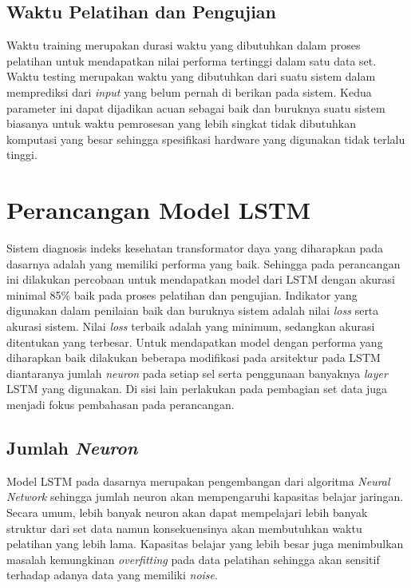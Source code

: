 \subsection{Waktu Pelatihan dan Pengujian}
Waktu training merupakan durasi waktu yang dibutuhkan dalam proses pelatihan untuk mendapatkan nilai performa tertinggi dalam satu data set. Waktu testing merupakan waktu yang dibutuhkan dari suatu sistem dalam memprediksi dari \textit{input} yang belum pernah di berikan pada sistem. Kedua parameter ini dapat dijadikan acuan sebagai baik dan buruknya suatu sistem biasanya untuk waktu pemrosesan  yang lebih singkat tidak dibutuhkan komputasi yang besar sehingga spesifikasi hardware yang digunakan tidak terlalu tinggi.

\section{Perancangan Model LSTM}

Sistem diagnosis indeks kesehatan transformator daya yang diharapkan pada dasarnya adalah yang memiliki performa yang baik. Sehingga pada perancangan ini dilakukan percobaan untuk mendapatkan model dari LSTM dengan akurasi minimal 85\% baik pada proses pelatihan dan pengujian. Indikator yang digunakan dalam penilaian baik dan buruknya sistem adalah nilai \textit{loss} serta akurasi sistem. Nilai \textit{loss} terbaik adalah yang minimum, sedangkan akurasi ditentukan yang terbesar. Untuk mendapatkan model dengan performa yang diharapkan baik dilakukan beberapa modifikasi pada arsitektur pada LSTM diantaranya jumlah \textit{neuron} pada setiap sel serta penggunaan banyaknya \textit{layer} LSTM yang digunakan. Di sisi lain perlakukan pada pembagian set data juga menjadi fokus pembahasan pada perancangan.

\subsection{Jumlah \textit{Neuron}}
Model LSTM pada dasarnya merupakan pengembangan dari algoritma \textit{Neural Network} sehingga jumlah neuron akan mempengaruhi kapasitas belajar jaringan. Secara umum, lebih banyak neuron akan dapat mempelajari lebih banyak struktur dari set data namun konsekuensinya akan membutuhkan waktu pelatihan yang lebih lama. Kapasitas belajar yang lebih besar juga menimbulkan masalah kemungkinan \textit{overfitting} pada data pelatihan sehingga akan sensitif terhadap adanya data yang memiliki \textit{noise}.


